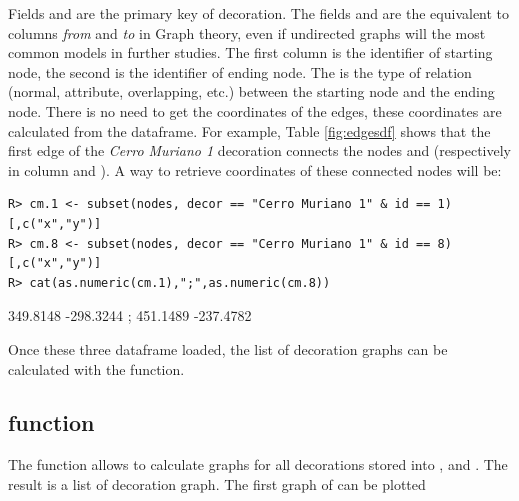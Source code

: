 \documentclass[article]{jss}\usepackage{knitr}
\begin{document}
Fields  and  are the primary key of decoration. The fields  and  are the equivalent to columns \emph{from} and \emph{to} in Graph theory, even if undirected graphs will the most common models in further studies. The first column is the identifier of starting node, the second is the identifier of ending node. The  is the type of relation (normal, attribute, overlapping, etc.) between the starting node and the ending node. There is no need to get the coordinates of the edges, these coordinates are calculated from the  dataframe. For example, Table \ref{fig:edgesdf} shows that the first edge of the \emph{Cerro Muriano 1} decoration connects the nodes  and  (respectively in column  and ). A way to retrieve coordinates of these connected nodes will be:

\begin{kframe}
\begin{verbatim}
R> cm.1 <- subset(nodes, decor == "Cerro Muriano 1" & id == 1)[,c("x","y")]
R> cm.8 <- subset(nodes, decor == "Cerro Muriano 1" & id == 8)[,c("x","y")]
R> cat(as.numeric(cm.1),";",as.numeric(cm.8))
\end{verbatim}
\end{kframe}349.8148 -298.3244 ; 451.1489 -237.4782

Once these three dataframe loaded, the list of decoration graphs can be calculated with the  function.

\subsection{ function} \label{sec:funlistdec}

The  function allows to calculate graphs for all decorations stored into ,  and . The result is a list of decoration graph. The first graph of can be plotted
\end{document}
